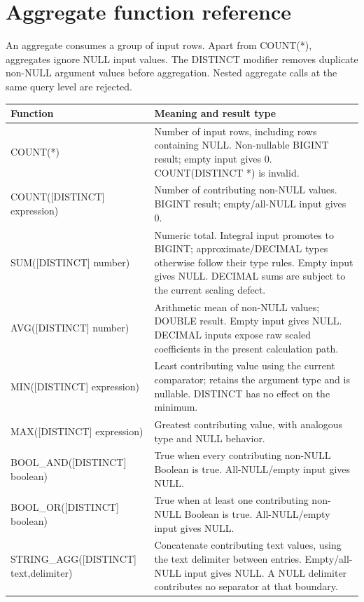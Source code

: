 \section{Aggregate function reference}
\label{sql:aggregate-functions}

An aggregate consumes a group of input rows. Apart from COUNT(*), aggregates ignore NULL input values. The DISTINCT modifier removes duplicate non-NULL argument values before aggregation. Nested aggregate calls at the same query level are rejected.

\begin{longtable}{p{.30\linewidth}p{.63\linewidth}}
\toprule
Function & Meaning and result type \\
\midrule
\endhead
COUNT(*) & Number of input rows, including rows containing NULL. Non-nullable BIGINT result; empty input gives 0. COUNT(DISTINCT *) is invalid. \\
COUNT([DISTINCT] expression) & Number of contributing non-NULL values. BIGINT result; empty/all-NULL input gives 0. \\
SUM([DISTINCT] number) & Numeric total. Integral input promotes to BIGINT; approximate/DECIMAL types otherwise follow their type rules. Empty input gives NULL. DECIMAL sums are subject to the current scaling defect. \\
AVG([DISTINCT] number) & Arithmetic mean of non-NULL values; DOUBLE result. Empty input gives NULL. DECIMAL inputs expose raw scaled coefficients in the present calculation path. \\
MIN([DISTINCT] expression) & Least contributing value using the current comparator; retains the argument type and is nullable. DISTINCT has no effect on the minimum. \\
MAX([DISTINCT] expression) & Greatest contributing value, with analogous type and NULL behavior. \\
BOOL\_AND([DISTINCT] boolean) & True when every contributing non-NULL Boolean is true. All-NULL/empty input gives NULL. \\
BOOL\_OR([DISTINCT] boolean) & True when at least one contributing non-NULL Boolean is true. All-NULL/empty input gives NULL. \\
STRING\_AGG([DISTINCT] text,delimiter) & Concatenate contributing text values, using the text delimiter between entries. Empty/all-NULL input gives NULL. A NULL delimiter contributes no separator at that boundary. \\
\bottomrule
\end{longtable}

